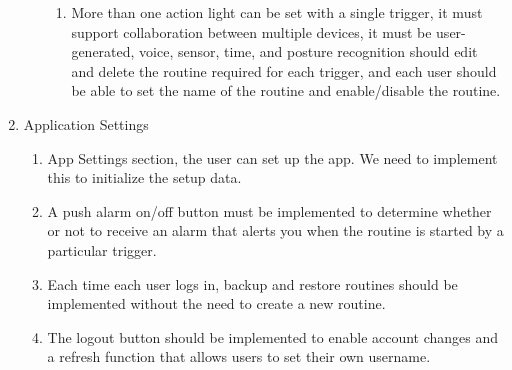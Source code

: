 \begin{enumerate}[label=\arabic*.]
\begin{enumerate}[label*={\arabic*.}]
\begin{enumerate}[label*={\arabic*.},ref=\theenumi.\arabic*]
            \item More than one action light can be set with a single trigger, it must support collaboration between multiple devices, it must be user-generated, voice, sensor, time, and posture recognition should edit and delete the routine required for each trigger, and each user should be able to set the name of the routine and enable/disable the routine.\\
    \end{enumerate}
\end{enumerate}

    \item {\large{Application Settings}}\\
    \begin{enumerate}[label*={\arabic*.},ref=\theenumi.\arabic*]
    \setlength{\itemindent}{0.5cm}
        \item App Settings section, the user can set up the app. We need to implement this to initialize the setup data.\\

        \item A push alarm on/off button must be implemented to determine whether or not to receive an alarm that alerts you when the routine is started by a particular trigger.\\

        \item Each time each user logs in, backup and restore routines should be implemented without the need to create a new routine.\\

        \item The logout button should be implemented to enable account changes and a refresh function that allows users to set their own username.\\
    \end{enumerate}
\end{enumerate}